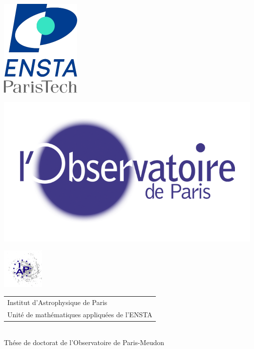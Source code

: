 \begin{titlepage}
	\begin{center}
		\begin{minipage}[c]{.3\linewidth}
			\centering \includegraphics[scale=0.2]{./logo/logo_ENSTA.png}
		\end{minipage}
		\hfill
		\begin{minipage}[c]{.18\linewidth}
			\centering \includegraphics[scale=0.1]{./logo/logo-obspm.png}
		\end{minipage}
		\hfill
		\begin{minipage}[c]{.18\linewidth}
			\centering \includegraphics[scale=0.5]{./logo/logo-iap.png}
		\end{minipage}
	\end{center}

	\vspace{0.5cm}
	\begin{tabular}{l}
		\large Institut d'Astrophysique de Paris \\
		\large Unité de mathématiques appliquées de l'ENSTA%
	\end{tabular} \\
	\vspace{0.5cm}
	\centering \Large Thése de doctorat de l'Observatoire de Paris-Meudon


\end{titlepage}
